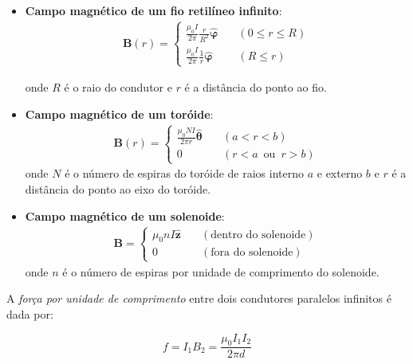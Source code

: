 \documentclass[12pt]{article}
\begin{document}
\begin{itemize}
    \item [(a)] \textbf{Campo magnético de um fio retilíneo infinito}:\\
        \begin{align}
                \boxed{\mathbf{B}(r) = \begin{cases}
                    \frac{\mu_0 I}{2\pi} \frac{r}{R^2} \hat{\boldsymbol{\varphi}} \quad &(0 \leq r \leq R) \\
                    \frac{\mu_0 I}{2\pi} \frac{1}{r} \hat{\boldsymbol{\varphi}} \quad &(R \leq r)
                \end{cases}}
        \end{align}    

        \noindent onde \(R\) é o raio do condutor e \(r\) é a distância do ponto ao fio.

    \item [(b)] \textbf{Campo magnético de um toróide}:
        \begin{align}
            \boxed{\mathbf{B}(r) = \begin{cases}
            		\frac{\mu_0 N I}{2\pi r}\hat{\boldsymbol{\theta}} \quad &(a < r < b) \\
            		0 \quad &(r < a \,\text{ ou }\, r > b)
            	\end{cases}}
        \end{align}
        \noindent onde \(N\) é o número de espiras do toróide de raios interno \(a\) e externo \(b\) e \(r\) é a distância do ponto ao eixo do toróide.

    \item [(c)] \textbf{Campo magnético de um solenoide}:
        \begin{align}
            \boxed{\mathbf{B} = \begin{cases}
            		\mu_0 n I\hat{\mathbf{z}} \quad &(\text{dentro do solenoide}) \\
            		0 \quad &(\text{fora do solenoide})
            	\end{cases}}
        \end{align}
        \noindent onde \(n\) é o número de espiras por unidade de comprimento do solenoide.
\end{itemize}

A \emph{força por unidade de comprimento} entre dois condutores paralelos infinitos é dada por:

\begin{equation}
    \boxed{f = I_1 B_2 = \frac{\mu_0 I_1 I_2}{2\pi d}}
\end{equation}
\end{document}
